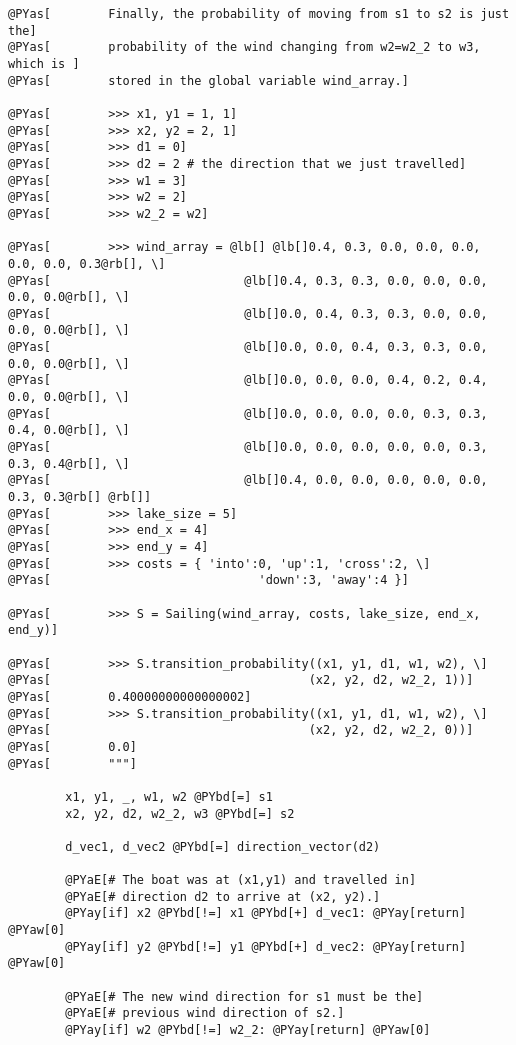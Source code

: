 \begin{Verbatim}[commandchars=@\[\]]
@PYas[        Finally, the probability of moving from s1 to s2 is just the]
@PYas[        probability of the wind changing from w2=w2_2 to w3, which is ]
@PYas[        stored in the global variable wind_array.]

@PYas[        >>> x1, y1 = 1, 1]
@PYas[        >>> x2, y2 = 2, 1]
@PYas[        >>> d1 = 0]
@PYas[        >>> d2 = 2 # the direction that we just travelled]
@PYas[        >>> w1 = 3]
@PYas[        >>> w2 = 2]
@PYas[        >>> w2_2 = w2]

@PYas[        >>> wind_array = @lb[] @lb[]0.4, 0.3, 0.0, 0.0, 0.0, 0.0, 0.0, 0.3@rb[], \]
@PYas[                           @lb[]0.4, 0.3, 0.3, 0.0, 0.0, 0.0, 0.0, 0.0@rb[], \]
@PYas[                           @lb[]0.0, 0.4, 0.3, 0.3, 0.0, 0.0, 0.0, 0.0@rb[], \]
@PYas[                           @lb[]0.0, 0.0, 0.4, 0.3, 0.3, 0.0, 0.0, 0.0@rb[], \]
@PYas[                           @lb[]0.0, 0.0, 0.0, 0.4, 0.2, 0.4, 0.0, 0.0@rb[], \]
@PYas[                           @lb[]0.0, 0.0, 0.0, 0.0, 0.3, 0.3, 0.4, 0.0@rb[], \]
@PYas[                           @lb[]0.0, 0.0, 0.0, 0.0, 0.0, 0.3, 0.3, 0.4@rb[], \]
@PYas[                           @lb[]0.4, 0.0, 0.0, 0.0, 0.0, 0.0, 0.3, 0.3@rb[] @rb[]]
@PYas[        >>> lake_size = 5]
@PYas[        >>> end_x = 4]
@PYas[        >>> end_y = 4]
@PYas[        >>> costs = { 'into':0, 'up':1, 'cross':2, \]
@PYas[                             'down':3, 'away':4 }]

@PYas[        >>> S = Sailing(wind_array, costs, lake_size, end_x, end_y)]

@PYas[        >>> S.transition_probability((x1, y1, d1, w1, w2), \]
@PYas[                                    (x2, y2, d2, w2_2, 1))]
@PYas[        0.40000000000000002]
@PYas[        >>> S.transition_probability((x1, y1, d1, w1, w2), \]
@PYas[                                    (x2, y2, d2, w2_2, 0))]
@PYas[        0.0]
@PYas[        """]

        x1, y1, _, w1, w2 @PYbd[=] s1
        x2, y2, d2, w2_2, w3 @PYbd[=] s2

        d_vec1, d_vec2 @PYbd[=] direction_vector(d2)

        @PYaE[# The boat was at (x1,y1) and travelled in]
        @PYaE[# direction d2 to arrive at (x2, y2).]
        @PYay[if] x2 @PYbd[!=] x1 @PYbd[+] d_vec1: @PYay[return] @PYaw[0]
        @PYay[if] y2 @PYbd[!=] y1 @PYbd[+] d_vec2: @PYay[return] @PYaw[0]

        @PYaE[# The new wind direction for s1 must be the]
        @PYaE[# previous wind direction of s2.]
        @PYay[if] w2 @PYbd[!=] w2_2: @PYay[return] @PYaw[0]


\end{Verbatim}
